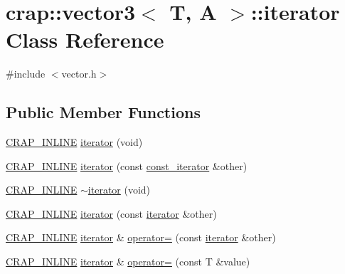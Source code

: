 \hypertarget{classcrap_1_1vector3_1_1iterator}{\section{crap\+:\+:vector3$<$ T, A $>$\+:\+:iterator Class Reference}
\label{classcrap_1_1vector3_1_1iterator}
}


{\ttfamily \#include $<$vector.\+h$>$}

\subsection*{Public Member Functions}
\begin{DoxyCompactItemize}
\item 
\hyperlink{config__x86_8h_a5a40526b8d842e7ff731509998bb0f1c}{C\+R\+A\+P\+\_\+\+I\+N\+L\+I\+N\+E} \hyperlink{classcrap_1_1vector3_1_1iterator_a1c9810800f9df6be45803564e69ca77b}{iterator} (void)
\item 
\hyperlink{config__x86_8h_a5a40526b8d842e7ff731509998bb0f1c}{C\+R\+A\+P\+\_\+\+I\+N\+L\+I\+N\+E} \hyperlink{classcrap_1_1vector3_1_1iterator_a9c9a1efa5ef545bf5824f64d53e9639d}{iterator} (const \hyperlink{classcrap_1_1vector3_1_1const__iterator}{const\+\_\+iterator} \&other)
\item 
\hyperlink{config__x86_8h_a5a40526b8d842e7ff731509998bb0f1c}{C\+R\+A\+P\+\_\+\+I\+N\+L\+I\+N\+E} \hyperlink{classcrap_1_1vector3_1_1iterator_a7bc5c39db1527c9d6ae7a21060ba6874}{$\sim$iterator} (void)
\item 
\hyperlink{config__x86_8h_a5a40526b8d842e7ff731509998bb0f1c}{C\+R\+A\+P\+\_\+\+I\+N\+L\+I\+N\+E} \hyperlink{classcrap_1_1vector3_1_1iterator_aa4cd9075724d461ab5c7d557bf0d65f8}{iterator} (const \hyperlink{classcrap_1_1vector3_1_1iterator}{iterator} \&other)
\item 
\hyperlink{config__x86_8h_a5a40526b8d842e7ff731509998bb0f1c}{C\+R\+A\+P\+\_\+\+I\+N\+L\+I\+N\+E} \hyperlink{classcrap_1_1vector3_1_1iterator}{iterator} \& \hyperlink{classcrap_1_1vector3_1_1iterator_abf797e5803db07d19ccbe88bc6a8920e}{operator=} (const \hyperlink{classcrap_1_1vector3_1_1iterator}{iterator} \&other)
\item 
\hyperlink{config__x86_8h_a5a40526b8d842e7ff731509998bb0f1c}{C\+R\+A\+P\+\_\+\+I\+N\+L\+I\+N\+E} \hyperlink{classcrap_1_1vector3_1_1iterator}{iterator} \& \hyperlink{classcrap_1_1vector3_1_1iterator_a0db1ba513071d67a4f225065a685f22a}{operator=} (const T \&value)
\item 

\end{DoxyCompactItemize}
